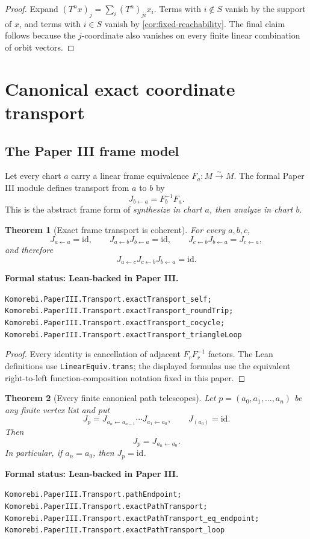 \documentclass[11pt]{article}
\newtheorem{theorem}{Theorem}[section]
\theoremstyle{definition}
\theoremstyle{remark}
\newcommand{\id}{\mathrm{id}}
\newcommand{\leanname}[1]{\nolinkurl{#1}}
\newcommand{\statusleanthree}[1]{%
  \par\smallskip\noindent
  {\color{leanblue}\textbf{Formal status: Lean-backed in Paper III.}}\par
  \begingroup\small\raggedright\leanname{#1}\par\endgroup\smallskip}
\begin{document}
\begin{proof}
Expand $(T^nx)_j=\sum_i(T^n)_{ji}x_i$.  Terms with $i\notin S$ vanish by
the support of $x$, and terms with $i\in S$ vanish by
\cref{cor:fixed-reachability}.  The final claim follows because the
$j$-coordinate also vanishes on every finite linear combination of orbit
vectors.
\end{proof}

\section{Canonical exact coordinate transport}
\label{sec:canonical-transport}

\subsection{The Paper III frame model}

Let every chart $a$ carry a linear frame equivalence
$F_a:M\xrightarrow{\sim}M$.  The formal Paper III module defines transport
from $a$ to $b$ by
\[
J_{b\leftarrow a}=F_b^{-1}F_a.
\]
This is the abstract frame form of \emph{synthesize in chart \(a\), then
analyze in chart \(b\)}.

\begin{theorem}[Exact frame transport is coherent]
\label{thm:exact-frame-transport}
For every $a,b,c$,
\[
J_{a\leftarrow a}=\id,\qquad
J_{a\leftarrow b}J_{b\leftarrow a}=\id,\qquad
J_{c\leftarrow b}J_{b\leftarrow a}=J_{c\leftarrow a},
\]
and therefore
\[
J_{a\leftarrow c}J_{c\leftarrow b}J_{b\leftarrow a}=\id.
\]
\end{theorem}
\statusleanthree{Komorebi.PaperIII.Transport.exactTransport_self; Komorebi.PaperIII.Transport.exactTransport_roundTrip; Komorebi.PaperIII.Transport.exactTransport_cocycle; Komorebi.PaperIII.Transport.exactTransport_triangleLoop}

\begin{proof}
Every identity is cancellation of adjacent $F_rF_r^{-1}$ factors.  The Lean
definitions use \leanname{LinearEquiv.trans}; the displayed formulas use the
equivalent right-to-left function-composition notation fixed in this paper.
\end{proof}

\begin{theorem}[Every finite canonical path telescopes]
\label{thm:exact-path-transport}
Let $p=(a_0,a_1,\ldots,a_n)$ be any finite vertex list and put
\[
J_p
=J_{a_n\leftarrow a_{n-1}}\cdots J_{a_1\leftarrow a_0},
\qquad
J_{(a_0)}=\id.
\]
Then
\[
J_p=J_{a_n\leftarrow a_0}.
\]
In particular, if $a_n=a_0$, then $J_p=\id$.
\end{theorem}
\statusleanthree{Komorebi.PaperIII.Transport.pathEndpoint; Komorebi.PaperIII.Transport.exactPathTransport; Komorebi.PaperIII.Transport.exactPathTransport_eq_endpoint; Komorebi.PaperIII.Transport.exactPathTransport_loop}
\end{document}
